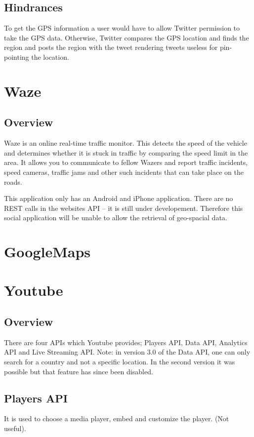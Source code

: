 \documentclass{article}
\begin{document}
\subsection{Hindrances}
To get the GPS information a user would have to allow Twitter permission to take the GPS data. Otherwise, Twitter compares the GPS location and finds the region and posts the region with the tweet rendering tweets useless for pin-pointing the location.

\section{Waze}
\subsection{Overview}
Waze is an online real-time traffic monitor. This detects the speed of the vehicle and determines whether it is stuck in traffic by comparing the speed limit in the area. It allows you to communicate to fellow Wazers and report traffic incidents, speed cameras, traffic jams and other such incidents that can take place on the roads.

This application only has an Android and iPhone application. There are no REST calls in the websites API -- it is still under developement. Therefore this social application will be unable to allow the retrieval of geo-spacial data.

\section{GoogleMaps}


\section{Youtube}
\subsection{Overview}
There are four APIs which Youtube provides; Players API, Data API, Analytics API and Live Streaming API.
Note: in version 3.0 of the Data API, one can only search for a country and not a specific location. In the second version it was possible but that feature has since been disabled.
\subsection{Players API}
It is used to choose a media player, embed and customize the player. (Not useful).
\end{document}
